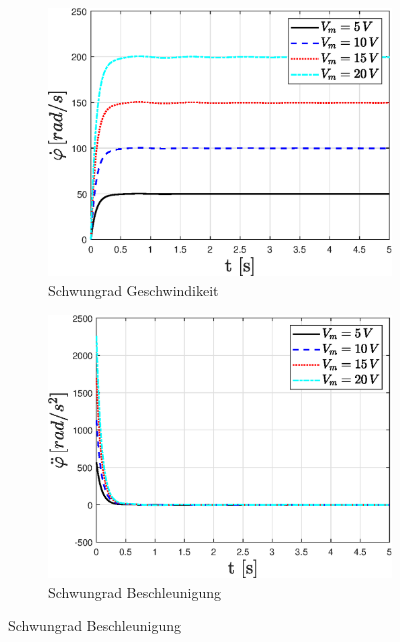 \begin{figure}
    \captionsetup[subfigure]{justification=centering,font=footnotesize}
    \begin{subfigure}[b]{0.49\linewidth}
        \includegraphics[width=\linewidth]{plot_data/parameter/fig/Vm_sprung/phi_punkt.eps}
        \caption{Schwungrad Geschwindikeit}
        \label{fig:Vm_sprung_phi_punkt}
    \end{subfigure}
    \begin{subfigure}[b]{0.49 \linewidth}
        \includegraphics[width=\linewidth]{plot_data/parameter/fig/Vm_sprung/phi_punkt_punkt.eps}
        \caption{Schwungrad Beschleunigung}

\end{subfigure}
\end{figure}
